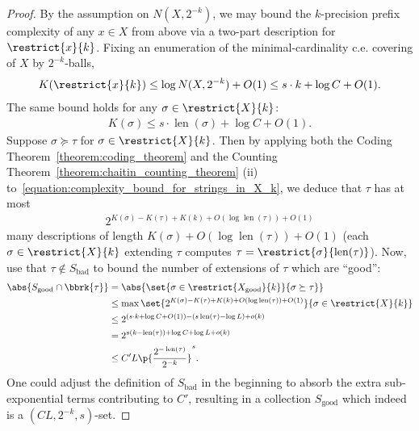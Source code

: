 \begin{proof}
    By the assumption on $N(X, 2^{-k})$, we may bound the $k$-precision prefix complexity of any $x \in X$ from above via a two-part description for $\restrict{x}{k}$. Fixing an enumeration of the minimal-cardinality c.e. covering of $X$ by $2^{-k}$-balls,
    \begin{align*}
        K(\restrict{x}{k}) \leq \log N(X, 2^{-k}) + O(1) \leq s \cdot k + \log C + O(1). 
    \end{align*}
    The same bound holds for any $\sigma \in \restrict{X}{k}$:
    \begin{align}
        \label{equation:complexity_bound_for_strings_in_X_k}
        K(\sigma) \leq s \cdot \operatorname{len}(\sigma) + \log C + O(1).
    \end{align}
    Suppose $\sigma \succeq \tau$ for $\sigma \in \restrict{X}{k}$. Then by applying both the Coding Theorem~\ref{theorem:coding_theorem} and the Counting Theorem~\ref{theorem:chaitin_counting_theorem} (ii) to~\eqref{equation:complexity_bound_for_strings_in_X_k}, we deduce that $\tau$ has at most 
    \begin{align*}
        2^{K(\sigma) - K(\tau) + K(k) + O(\log \operatorname{len}(\tau)) + O(1)}
    \end{align*}
    many descriptions of length $K(\sigma) + O(\log \operatorname{len}(\tau)) + O(1)$ (each $\sigma \in \restrict{X}{k}$ extending $\tau$ computes $\tau = \restrict{\sigma}{\operatorname{len}(\tau)}$). Now, use that $\tau \not\in S_{\operatorname{bad}}$ to bound the number of extensions of $\tau$ which are ``good'':
    \begin{align*}
        \abs{S_{\operatorname{good}} \cap \bbrk{\tau}} &= \abs{\set{\sigma \in \restrict{X_{\operatorname{good}}}{k}}{\sigma \succeq \tau}}\\
        &\leq \max \set{2^{K(\sigma) - K(\tau) +  K(k) + O(\log \operatorname{len}(\tau)) + O(1)}}{\sigma \in \restrict{X}{k}}\\
        &\leq 2^{(s \cdot k + \log C + O(1)) - (s \operatorname{len}(\tau) - \log L) + o(k)}\\
        &= 2^{s(k - \operatorname{len}(\tau)) + \log C + \log L + o(k)} \\
        &\leq C' L \p{\frac{2^{-\operatorname{len}(\tau)}}{2^{-k}}}^s.
    \end{align*}
    One could adjust the definition of $S_{\operatorname{bad}}$ in the beginning to absorb the extra sub-exponential terms contributing to $C'$, resulting in a collection $S_{\operatorname{good}}$ which indeed is a $(C L, 2^{-k}, s)$-set.
\end{proof}

